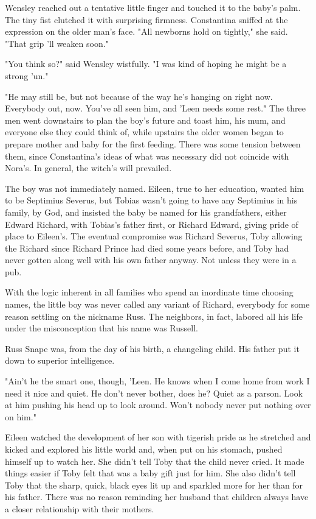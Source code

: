 Wensley reached out a tentative little finger and touched it to the baby's palm. The tiny fist clutched it with surprising firmness. Constantina sniffed at the expression on the older man's face. "All newborns hold on tightly," she said. "That grip 'll weaken soon."

"You think so?" said Wensley wistfully. "I was kind of hoping he might be a strong 'un."

"He may still be, but not because of the way he's hanging on right now. Everybody out, now. You've all seen him, and 'Leen needs some rest." The three men went downstairs to plan the boy's future and toast him, his mum, and everyone else they could think of, while upstairs the older women began to prepare mother and baby for the first feeding. There was some tension between them, since Constantina's ideas of what was necessary did not coincide with Nora's. In general, the witch's will prevailed.

The boy was not immediately named. Eileen, true to her education, wanted him to be Septimius Severus, but Tobias wasn't going to have any Septimius in his family, by God, and insisted the baby be named for his grandfathers, either Edward Richard, with Tobias's father first, or Richard Edward, giving pride of place to Eileen's. The eventual compromise was Richard Severus, Toby allowing the Richard since Richard Prince had died some years before, and Toby had never gotten along well with his own father anyway. Not unless they were in a pub.

With the logic inherent in all families who spend an inordinate time choosing names, the little boy was never called any variant of Richard, everybody for some reason settling on the nickname Russ. The neighbors, in fact, labored all his life under the misconception that his name was Russell.

Russ Snape was, from the day of his birth, a changeling child. His father put it down to superior intelligence.

"Ain't he the smart one, though, 'Leen. He knows when I come home from work I need it nice and quiet. He don't never bother, does he? Quiet as a parson. Look at him pushing his head up to look around. Won't nobody never put nothing over on him."

Eileen watched the development of her son with tigerish pride as he stretched and kicked and explored his little world and, when put on his stomach, pushed himself up to watch her. She didn't tell Toby that the child never cried. It made things easier if Toby felt that was a baby gift just for him. She also didn't tell Toby that the sharp, quick, black eyes lit up and sparkled more for her than for his father. There was no reason reminding her husband that children always have a closer relationship with their mothers.

